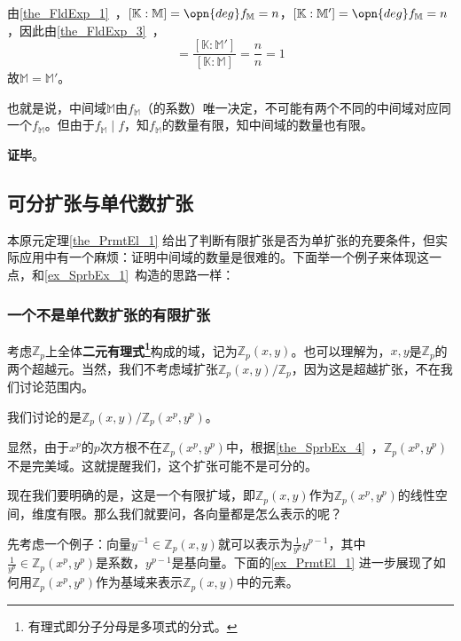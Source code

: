由\autoref{the_FldExp_1}~，$[\mathbb{K}:\mathbb{M}]=\opn{deg}f_\mathbb{M}=n$，$[\mathbb{K}:\mathbb{M}']=\opn{deg}f_\mathbb{M}=n$，因此由\autoref{the_FldExp_3}~，
\begin{equation}
[\mathbb{M}:\mathbb{M}']=\frac{[\mathbb{K}:\mathbb{M}']}{[\mathbb{K}:\mathbb{M}]}=\frac{n}{n}=1
\end{equation}
故$\mathbb{M}=\mathbb{M}'$。

也就是说，中间域$\mathbb{M}$由$f_\mathbb{M}$（的系数）唯一决定，不可能有两个不同的中间域对应同一个$f_{\mathbb{M}}$。但由于$f_\mathbb{M}\mid f$，知$f_\mathbb{M}$的数量有限，知中间域的数量也有限。

\textbf{证毕}。


\subsection{可分扩张与单代数扩张}

本原元定理\autoref{the_PrmtEl_1} 给出了判断有限扩张是否为单扩张的充要条件，但实际应用中有一个麻烦：证明中间域的数量是很难的。下面举一个例子来体现这一点，和\autoref{ex_SprbEx_1}~构造的思路一样：

\subsubsection{一个不是单代数扩张的有限扩张}

考虑$\mathbb{Z}_p$上全体\textbf{二元有理式\footnote{有理式即分子分母是多项式的分式。}}构成的域，记为$\mathbb{Z}_p(x, y)$。也可以理解为，$x, y$是$\mathbb{Z}_p$的两个超越元。当然，我们不考虑域扩张$\mathbb{Z}_p(x, y)/\mathbb{Z}_p$，因为这是超越扩张，不在我们讨论范围内。

我们讨论的是$\mathbb{Z}_p(x, y)/\mathbb{Z}_p(x^p, y^p)$。

显然，由于$x^p$的$p$次方根不在$\mathbb{Z}_p(x^p, y^p)$中，根据\autoref{the_SprbEx_4}~，$\mathbb{Z}_p(x^p, y^p)$不是完美域。这就提醒我们，这个扩张可能不是可分的。

现在我们要明确的是，这是一个有限扩域，即$\mathbb{Z}_p(x, y)$作为$\mathbb{Z}_p(x^p, y^p)$的线性空间，维度有限。那么我们就要问，各向量都是怎么表示的呢？

先考虑一个例子：向量$y^{-1}\in\mathbb{Z}_p(x, y)$就可以表示为$\frac{1}{y^p}y^{p-1}$，其中$\frac{1}{y^p}\in\mathbb{Z}_p(x^p, y^p)$是系数，$y^{p-1}$是基向量。下面的\autoref{ex_PrmtEl_1} 进一步展现了如何用$\mathbb{Z}_p(x^p, y^p)$作为基域来表示$\mathbb{Z}_p(x, y)$中的元素。

